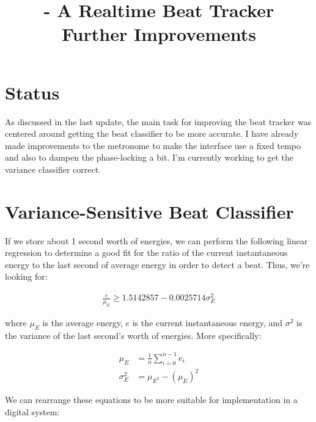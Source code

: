 \documentclass[letterpaper]{article}
\title{\projname{} - A Realtime Beat Tracker \\ Further Improvements}
\begin{document}
\maketitle

\section{Status}

    As discussed in the last update, the main task for improving the beat
    tracker was centered around getting the beat classifier to be more
    accurate.  I have already made improvements to the metronome to make the
    interface use a fixed tempo and also to dampen the phase-locking a bit.
    I'm currently working to get the variance classifier correct.


\section{Variance-Sensitive Beat Classifier}
    
    If we store about 1 second worth of energies, we can perform the following
    linear regression to determine a good fit for the ratio of the current
    instantaneous energy to the last second of average energy in order to
    detect a beat.  Thus, we're looking for:

    \begin{align}
        \frac{e}{\mu_E} \geq 1.5142857 - 0.0025714 \sigma^2_E
    \end{align}

    where $\mu_E$ is the average energy, $e$ is the current instantaneous
    energy, and $\sigma^2$ is the variance of the last second's worth of
    energies.  More specifically:

    \begin{align}
        \mu_E &= \frac{1}{n} \sum_{i=0}^{n-1} e_i \\
        \sigma^2_E &= \mu_{E^2} - (\mu_E)^2
    \end{align}

    We can rearrange these equations to be more suitable for implementation in
    a digital system:
\end{document}
